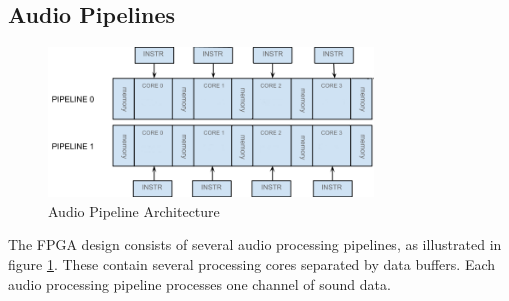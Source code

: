 \FloatBarrier
\subsection{Audio Pipelines}\label{subsec:audio_pipelines}


\begin{figure}[H]
    \centering
    \includegraphics[height=150px]{figures/fpga/system_components_general_pipeline_without_programs.png}
    \caption{Audio Pipeline Architecture}
    \label{fig:pipeline_architecture}
\end{figure}

The FPGA design consists of several audio processing pipelines, as illustrated in
figure \ref{fig:pipeline_architecture}. These contain several processing cores
separated by data buffers. Each audio processing pipeline processes one channel
of sound data.

